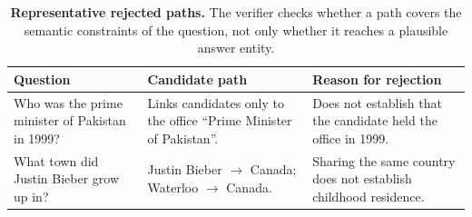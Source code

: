 \begin{table}[t]
\centering
\small
\begin{tabular}{p{4.2cm} p{5.6cm} p{5.2cm}}
\toprule
\textbf{Question} & \textbf{Candidate path} & \textbf{Reason for rejection} \\
\midrule
Who was the prime minister of Pakistan in 1999?
& Links candidates only to the office ``Prime Minister of Pakistan''.
& Does not establish that the candidate held the office in 1999. \\
\midrule
What town did Justin Bieber grow up in?
& Justin Bieber $\rightarrow$ Canada; Waterloo $\rightarrow$ Canada.
& Sharing the same country does not establish childhood residence. \\
\bottomrule
\end{tabular}
\caption{\textbf{Representative rejected paths.} The verifier checks whether a path covers the semantic constraints of the question, not only whether it reaches a plausible answer entity.}
\label{tab:rejected_paths}
\end{table}
